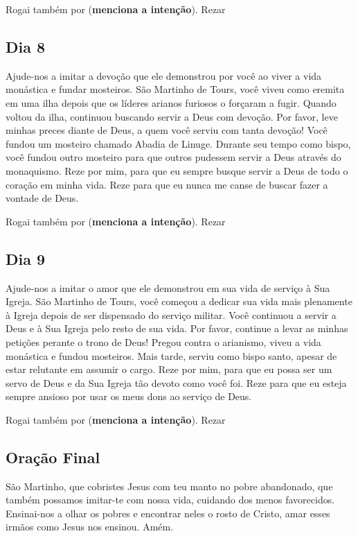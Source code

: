 \documentclass[a4paper,14pt,twoside]{extarticle} \usepackage[utf8]{inputenc}
\begin{document}
Rogai também por (\textbf{menciona a intenção}). Rezar \textbf{}

\subsection{Dia 8}
Ajude-nos a imitar a devoção que ele demonstrou por você ao viver a vida monástica e fundar mosteiros. São Martinho de Tours, você viveu como eremita em uma ilha depois que os líderes arianos furiosos o forçaram a fugir. Quando voltou da ilha, continuou buscando servir a Deus com devoção. Por favor, leve minhas preces diante de Deus, a quem você serviu com tanta devoção! Você fundou um mosteiro chamado Abadia de Linuge. Durante seu tempo como bispo, você fundou outro mosteiro para que outros pudessem servir a Deus através do monaquismo. Reze por mim, para que eu sempre busque servir a Deus de todo o coração em minha vida. Reze para que eu nunca me canse de buscar fazer a vontade de Deus. 

Rogai também por (\textbf{menciona a intenção}). Rezar \textbf{}

\subsection{Dia 9}
Ajude-nos a imitar o amor que ele demonstrou em sua vida de serviço à Sua Igreja. São Martinho de Tours, você começou a dedicar sua vida mais plenamente à Igreja depois de ser dispensado do serviço militar. Você continuou a servir a Deus e à Sua Igreja pelo resto de sua vida. Por favor, continue a levar as minhas petições perante o trono de Deus! Pregou contra o arianismo, viveu a vida monástica e fundou mosteiros. Mais tarde, serviu como bispo santo, apesar de estar relutante em assumir o cargo. Reze por mim, para que eu possa ser um servo de Deus e da Sua Igreja tão devoto como você foi. Reze para que eu esteja sempre ansioso por usar os meus dons ao serviço de Deus. 

Rogai também por (\textbf{menciona a intenção}). Rezar \textbf{}


\subsection{Oração Final}\label{sub:Oração Final} %

São Martinho, que cobristes Jesus com teu manto no pobre abandonado, que também possamos imitar-te com nossa vida, cuidando dos menos favorecidos. Ensinai-nos a olhar os pobres e encontrar neles o rosto de Cristo, amar esses irmãos como Jesus nos ensinou. Amém.
\end{document}
